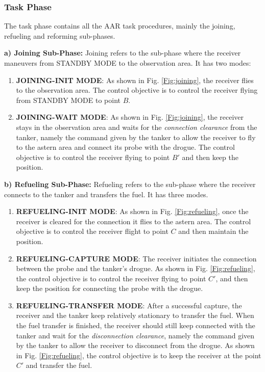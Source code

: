\subsubsection{Task Phase}
The task phase contains all the AAR task procedures, mainly the joining, refueling and reforming sub-phases.

\vspace{1ex}
\hspace{-1.5em}\textbf{a) Joining Sub-Phase:} Joining refers to the sub-phase where the receiver maneuvers from STANDBY MODE to the observation area. It has two modes:

\begin{enumerate}
	\item \textbf{JOINING-INIT MODE}: As shown in Fig. \ref{Fig:joining}, the receiver flies to the observation area. The control objective is to control the receiver flying from STANDBY MODE to point $ B $.
	\item \textbf{JOINING-WAIT MODE}: As shown in Fig. \ref{Fig:joining}, the receiver stays in the observation area and waits for the \textit{connection clearance} from the tanker, namely the command given by the tanker to allow the receiver to fly to the astern area and connect its probe with the drogue. The control objective is to control the receiver flying to point $ B' $ and then keep the position.
\end{enumerate}

\hspace{-1.5em}\textbf{b) Refueling Sub-Phase:} Refueling refers to the sub-phase where the receiver connects to the tanker and transfers the fuel. It has three modes. 
\begin{enumerate}
	\item \textbf{REFUELING-INIT MODE}: As shown in Fig. \ref{Fig:refueling}, once the receiver is cleared for the connection it flies to the astern area. The control objective is to control the receiver flight to point $ C $ and then maintain the position.
	\item \textbf{REFUELING-CAPTURE MODE}: The receiver initiates the connection between the probe and the tanker's drogue. As shown in Fig. \ref{Fig:refueling}, the control objective is to control the receiver flying to point $ C' $, and then keep the position for connecting the probe with the drogue.
	\item \textbf{REFUELING-TRANSFER MODE}: After a successful capture, the receiver and the tanker keep relatively stationary to transfer the fuel. When the fuel transfer is finished, the receiver should still keep connected with the tanker and wait for the \textit{disconnection clearance}, namely the command given by the tanker to allow the receiver to disconnect from the drogue. As shown in Fig. \ref{Fig:refueling}, the control objective is to keep the receiver at the point  $ C' $ and transfer the fuel.
\end{enumerate}

